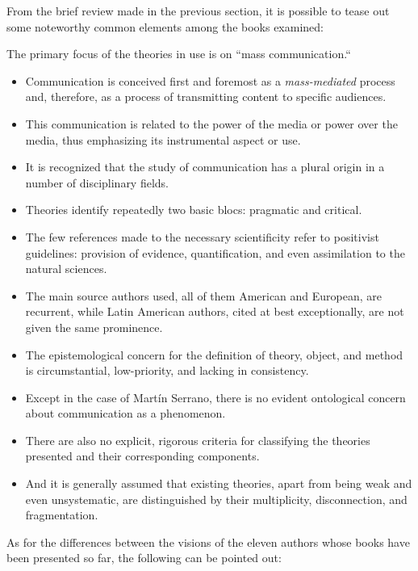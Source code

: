 \documentclass{tufte-handout}
\begin{document}
From the brief review made in the previous section, it is possible to
tease out some noteworthy common elements among the books examined:

The primary focus of the theories in use is on ``mass communication.``

\begin{itemize}
\item
  Communication is conceived first and foremost as a
  \emph{mass-mediated} process and, therefore, as a process of
  transmitting content to specific audiences.
\item
  This communication is related to the power of the media or power over
  the media, thus emphasizing its instrumental aspect or use.
\item
  It is recognized that the study of communication has a plural origin
  in a number of disciplinary fields.
\item
  Theories identify repeatedly two basic blocs: pragmatic and critical.
\item
  The few references made to the necessary scientificity refer to
  positivist guidelines: provision of evidence, quantification, and even
  assimilation to the natural sciences.
\item
  The main source authors used, all of them American and European, are
  recurrent, while Latin American authors, cited at best exceptionally,
  are not given the same prominence.
\item
  The epistemological concern for the definition of theory, object, and
  method is circumstantial, low-priority, and lacking in consistency.
\item
  Except in the case of Martín Serrano, there is no evident ontological
  concern about communication as a phenomenon.
\item
  There are also no explicit, rigorous criteria for classifying the
  theories presented and their corresponding components.
\item
  And it is generally assumed that existing theories, apart from being
  weak and even unsystematic, are distinguished by their multiplicity,
  disconnection, and fragmentation.
\end{itemize}

As for the differences between the visions of the eleven authors whose
books have been presented so far, the following can be pointed out:
\end{document}
